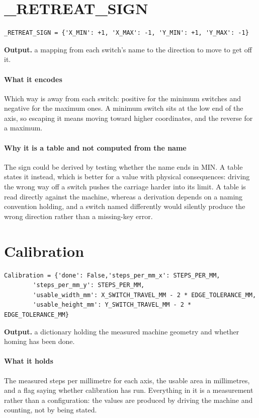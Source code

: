 \section{\_RETREAT\_SIGN}
\begin{lstlisting}[style=sig]
_RETREAT_SIGN = {'X_MIN': +1, 'X_MAX': -1, 'Y_MIN': +1, 'Y_MAX': -1}
\end{lstlisting}

\noindent\textbf{Output.} a mapping from each switch's name to the direction to move to get off it.


\paragraph{What it encodes}
Which way is away from each switch: positive for the minimum switches and negative for the maximum ones. A minimum switch sits at the low end of the axis, so escaping it means moving toward higher coordinates, and the reverse for a maximum.


\paragraph{Why it is a table and not computed from the name}
The sign could be derived by testing whether the name ends in MIN. A table states it instead, which is better for a value with physical consequences: driving the wrong way off a switch pushes the carriage harder into its limit. A table is read directly against the machine, whereas a derivation depends on a naming convention holding, and a switch named differently would silently produce the wrong direction rather than a missing-key error.


\section{Calibration}
\begin{lstlisting}[style=sig]
Calibration = {'done': False,'steps_per_mm_x': STEPS_PER_MM,
        'steps_per_mm_y': STEPS_PER_MM,
        'usable_width_mm': X_SWITCH_TRAVEL_MM - 2 * EDGE_TOLERANCE_MM,
        'usable_height_mm': Y_SWITCH_TRAVEL_MM - 2 * EDGE_TOLERANCE_MM}
\end{lstlisting}

\noindent\textbf{Output.} a dictionary holding the measured machine geometry and whether homing has been done.


\paragraph{What it holds}
The measured steps per millimetre for each axis, the usable area in millimetres, and a flag saying whether calibration has run. Everything in it is a measurement rather than a configuration: the values are produced by driving the machine and counting, not by being stated.


